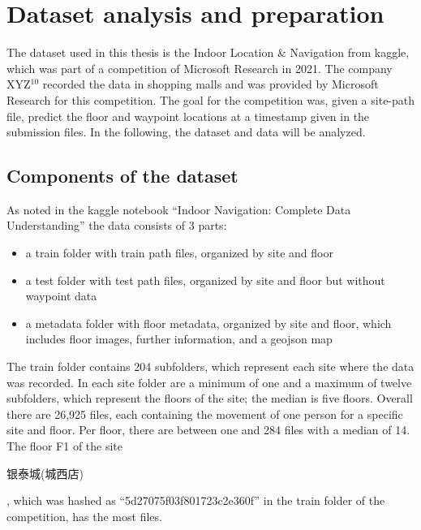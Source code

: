 \chapter{Dataset analysis and preparation}\label{sec:data-ana}

The dataset used in this thesis is the Indoor Location \& Navigation from kaggle\cite{kaggle}, which was part of a competition of Microsoft Research in 2021\cite{IndoorLocationNavigation}.
The company XYZ\(^{10}\)  recorded the data in shopping malls and was provided by Microsoft Research for this competition.
The goal for the competition was, given a site-path file, predict the floor and waypoint locations at a timestamp given in the submission files.
In the following, the dataset and data will be analyzed.


\section{Components of the dataset}\label{sec:data}
As noted in the kaggle notebook ``Indoor Navigation: Complete Data Understanding'' \cite{IndoorNavigationUnderstanding} the data consists of 3 parts:

\begin{itemize}
    \item a train folder with train path files, organized by site and floor
    \item a test folder with test path files, organized by site and floor but without waypoint data
    \item a metadata folder with floor metadata, organized by site and floor, which includes floor images, further information, and a geojson map
\end{itemize}

The train folder contains 204 subfolders, which represent each site where the data was recorded.
In each site folder are a minimum of one and a maximum of twelve subfolders, which represent the floors of the site; the median is five floors.
Overall there are 26,925 files, each containing the movement of one person for a specific site and floor.
Per floor, there are between one and 284 files with a median of 14.
The floor F1 of the site \begin{CJK*}{UTF8}{gbsn}银泰城(城西店)\end{CJK*}, which was hashed as ``5d27075f03f801723c2e360f'' in the train folder of the competition, has the most files.


